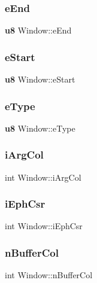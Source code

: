 \mbox{\label{struct_window_ae65b0a512ec3fe90dae608d569370601}} 
\subsubsection{eEnd}
{\footnotesize\ttfamily \textbf{ u8} Window\+::e\+End}

\mbox{\label{struct_window_ab1d4cdb6f7fb6a7294a0a6a234d7c633}} 
\subsubsection{eStart}
{\footnotesize\ttfamily \textbf{ u8} Window\+::e\+Start}

\mbox{\label{struct_window_a207652f59d8a79c45976a68aced94848}} 
\subsubsection{eType}
{\footnotesize\ttfamily \textbf{ u8} Window\+::e\+Type}

\mbox{\label{struct_window_ac0118b21df4b91254a7d54d32a86c02e}} 
\subsubsection{iArgCol}
{\footnotesize\ttfamily int Window\+::i\+Arg\+Col}

\mbox{\label{struct_window_aeda37a24b1a9d092fdbe316d78fd1e1d}} 
\subsubsection{iEphCsr}
{\footnotesize\ttfamily int Window\+::i\+Eph\+Csr}

\mbox{\label{struct_window_a9c31ed89c480196d8129ac48520820b1}} 
\subsubsection{nBufferCol}
{\footnotesize\ttfamily int Window\+::n\+Buffer\+Col}

\mbox{\label{struct_window_a3e50d5dd87dfb5cb46db4d9acc1534aa}} 
